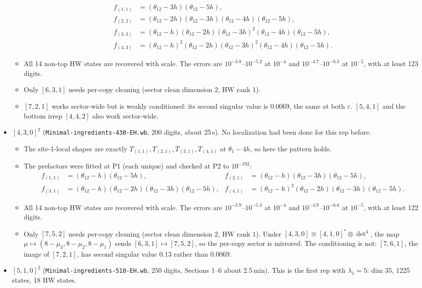 \documentclass[11pt]{article}
\newcommand{\eps}{\varepsilon}
\newcommand{\tw}{\theta_{12}}
\begin{document}
\begin{itemize}
\begin{itemize}
\begin{align*}
  f_{(1,1)}&=(\tw-3h)(\tw-5h),\\
  f_{(2,2)}&=(\tw-2h)(\tw-3h)(\tw-4h)(\tw-5h),\\
  f_{(3,3)}&=(\tw-h)(\tw-2h)(\tw-3h)^2(\tw-4h)(\tw-5h),\\
  f_{(4,3)}&=(\tw-h)^2(\tw-2h)(\tw-3h)^2(\tw-4h)(\tw-5h).
  \end{align*}
  \item All 14 non-top HW states are recovered with scale. The errors are $10^{-3.8}$--$10^{-5.2}$ at $10^{-4}$ and $10^{-4.7}$--$10^{-6.3}$ at $10^{-5}$, with at least 123 digits.
  \item Only $[6,3,1]$ needs per-copy cleaning (sector clean dimension 2, HW rank 1).
  \item $[7,2,1]$ works sector-wide but is weakly conditioned: its second singular value is $0.0069$, the same at both $\eps$. $[5,4,1]$ and the bottom irrep $[4,4,2]$ also work sector-wide.
  \end{itemize}
\item \textbf{$[4,3,0]^2$} (\texttt{Minimal-ingredients-430-EH.wb}, 200 digits, about 25\,s). No localization had been done for this rep before.
  \begin{itemize}
  \item The site-1-local shapes are exactly $T_{(1,1)},T_{(2,1)},T_{(3,1)},T_{(4,1)}$ at $\theta_1-4h$, so here the pattern holds.
  \item The prefactors were fitted at P1 (each unique) and checked at P2 to $10^{-192}$:
  \begin{align*}
  f_{(1,1)}&=(\tw-h)(\tw-5h), & f_{(2,1)}&=(\tw-h)(\tw-3h)(\tw-5h),\\
  f_{(3,1)}&=(\tw-h)(\tw-2h)(\tw-3h)(\tw-5h), & f_{(4,1)}&=(\tw-h)^2(\tw-2h)(\tw-3h)(\tw-5h).
  \end{align*}
  \item All 14 non-top HW states are recovered with scale. The errors are $10^{-3.9}$--$10^{-5.3}$ at $10^{-4}$ and $10^{-4.9}$--$10^{-6.6}$ at $10^{-5}$, with at least 122 digits.
  \item Only $[7,5,2]$ needs per-copy cleaning (sector clean dimension 2, HW rank 1). Under $[4,3,0]\cong[4,1,0]^*\otimes\det^4$, the map $\mu\mapsto(8-\mu_3,8-\mu_2,8-\mu_1)$ sends $[6,3,1]\mapsto[7,5,2]$, so the per-copy sector is mirrored. The conditioning is not: $[7,6,1]$, the image of $[7,2,1]$, has second singular value $0.13$ rather than $0.0069$.
  \end{itemize}
\item \textbf{$[5,1,0]^2$} (\texttt{Minimal-ingredients-510-EH.wb}, 250 digits, Sections 1--6 about 2.5\,min). This is the first rep with $\lambda_1=5$: dim 35, 1225 states, 18 HW states.

\end{itemize}
\end{document}
